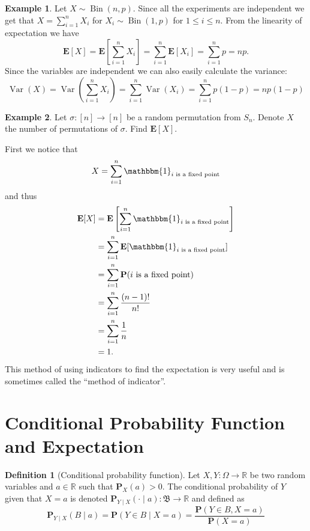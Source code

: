 \documentclass[11pt,a4paper]{article}
\theoremstyle{definition}
\newtheorem{definition}{Definition}[section]
\newtheorem{example}{Example}[section]
\theoremstyle{plain}
\DeclareMathOperator{\Bin}{Bin}
\DeclareMathOperator{\Var}{Var}
\newcommand{\R}{\mathbb{R}}
\newcommand{\E}{\mathbf{E}}
\newcommand{\Prob}{\mathbf{P}}
\begin{document}
  \begin{example}
    Let $X \sim \Bin(n,p)$. Since all the experiments are independent
    we get that $X = \sum_{i=1}^{n} X_i$ for $X_i \sim \Bin(1,p)$ for
    $1 \le i \le n$. From the linearity of expectation we have
    \[
      \E[X] =
      \E\left[\sum_{i=1}^{n} X_i\right] =
      \sum_{i=1}^{n} \E[X_i] =
      \sum_{i=1}^{n} p =
      np.
    \]
    Since the variables are independent we can also easily calculate
    the variance:
    \[
      \Var(X) =
      \Var\left(\sum_{i=1}^{n} X_i\right) =
      \sum_{i=1}^{n} \Var(X_i) =
      \sum_{i=1}^{n} p(1-p) =
      n p(1-p)
    \]
  \end{example}
  
  \begin{example}
    Let $\sigma \colon [n] \to [n]$ be a random permutation from $S_n$.
    Denote $X$ the number of permutations of $\sigma$. Find $\E[X]$.

    First we notice that
    \[
      X = \sum_{i=1}^{n} \mathbbm{1}_{i \text{ is a fixed point}}
    \]
    and thus
    \begin{align*}
      \E[X] &=
      \E\left[\sum_{i=1}^{n} \mathbbm{1}_{i \text{ is a fixed point}}\right] \\
      &= \sum_{i=1}^{n} \E[\mathbbm{1}_{i \text{ is a fixed point}}] \\
      &= \sum_{i=1}^{n} \Prob(i \text{ is a fixed point}) \\
      &= \sum_{i=1}^{n} \frac{(n-1)!}{n!} \\
      &= \sum_{i=1}^{n} \frac{1}{n} \\
      &= 1.
    \end{align*}
    This method of using indicators to find the expectation is very useful
    and is sometimes called the ``method of indicator''.
  \end{example}
  
  \newpage

  \section{Conditional Probability Function and Expectation}

  \begin{definition}[Conditional probability function]
    Let $X,Y \colon \Omega \to \R$ be two random variables and $a \in \R$
    such that $\Prob_X(a) > 0$. The conditional probability of $Y$ given
    that $X = a$ is denoted 
    $\Prob_{Y \mid X}(\cdot \mid a) \colon \mathfrak B \to \R$ and defined as
    \[
      \Prob_{Y \mid X}(B \mid a) =
      \Prob(Y \in B \mid X = a) =
      \frac{\Prob(Y \in B, X = a)}{\Prob(X = a)}
    \]
  \end{definition}
  
\end{document}
